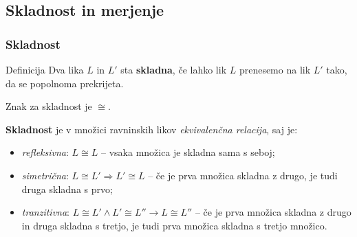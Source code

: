     \subsection{Skladnost in merjenje}

        \begin{frame}
            \frametitle{Skladnost}

            \begin{alertblock}{Definicija}
                Dva lika $L$ in $L'$ sta \textbf{skladna}, če lahko lik $L$ prenesemo na lik $L'$ tako,
                da se popolnoma prekrijeta.

                Znak za skladnost je $\cong$.
            \end{alertblock}

            \begin{block}{}
                \textbf{Skladnost} je v množici ravninskih likov \textit{ekvivalenčna relacija}, saj je:
                \begin{itemize}
                    \item \textit{refleksivna}: $L\cong L$ -- vsaka množica je skladna sama s seboj;
                    \item \textit{simetrična}: $L\cong L' \Rightarrow L'\cong L$ -- če je prva množica skladna z drugo, je tudi druga skladna s prvo;
                    \item \textit{tranzitivna}: $L\cong L' \land L'\cong L'' \rightarrow L\cong L''$ -- če je prva množica skladna z drugo in druga skladna s tretjo, 
                            je tudi prva množica skladna s tretjo množico.
                \end{itemize}
            \end{block}
        \end{frame}


